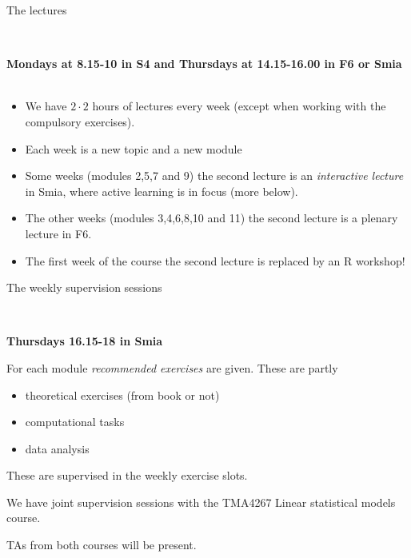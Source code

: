 \documentclass[ignorenonframetext,]{beamer}
\providecommand{\tightlist}{%
  \setlength{\itemsep}{0pt}\setlength{\parskip}{0pt}}
\begin{document}
\begin{frame}

\begin{block}{The lectures}

~

\textbf{Mondays at 8.15-10 in S4 and Thursdays at 14.15-16.00 in F6 or
Smia} ~

\begin{itemize}
\tightlist
\item
  We have \(2\cdot 2\) hours of lectures every week (except when working
  with the compulsory exercises).
\item
  Each week is a new topic and a new module
\item
  Some weeks (modules 2,5,7 and 9) the second lecture is an
  \emph{interactive lecture} in Smia, where active learning is in focus
  (more below).
\item
  The other weeks (modules 3,4,6,8,10 and 11) the second lecture is a
  plenary lecture in F6.
\item
  The first week of the course the second lecture is replaced by an R
  workshop!
\end{itemize}

\end{block}

\end{frame}

\begin{frame}

\begin{block}{The weekly supervision sessions}

~

\textbf{Thursdays 16.15-18 in Smia} ~\\
\hspace*{0.333em}

For each module \emph{recommended exercises} are given. These are partly

\begin{itemize}
\tightlist
\item
  theoretical exercises (from book or not)
\item
  computational tasks
\item
  data analysis
\end{itemize}

These are supervised in the weekly exercise slots.

We have joint supervision sessions with the TMA4267 Linear statistical
models course.

TAs from both courses will be present.

\end{block}

\end{frame}
\end{document}
